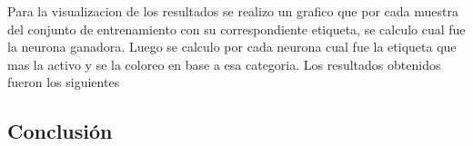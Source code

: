 Para la visualizacion de los resultados se realizo un grafico que por cada muestra del conjunto de entrenamiento
 con su correspondiente etiqueta, se calculo cual fue la neurona ganadora. Luego se calculo por cada neurona cual fue la etiqueta
 que mas la activo y se la coloreo en base a esa categoria.
Los resultados obtenidos fueron los siguientes
\subsection{Conclusión}
